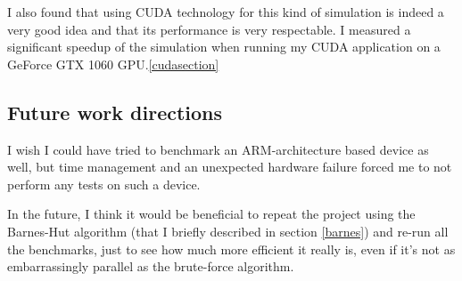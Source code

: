 \documentclass[journal]{IEEEtran}
\begin{document}
		I also found that using CUDA technology for this kind of simulation is indeed a very good idea and that its performance is very respectable. I measured a significant speedup of the simulation when running my CUDA application on a GeForce GTX 1060 GPU.\ref{cudasection}

		\subsection*{Future work directions}	
			
			I wish I could have tried to benchmark an ARM-architecture based device as well, but time management and an unexpected hardware failure forced me to not perform any tests on such a device.
			
			In the future, I think it would be beneficial to repeat the project using the Barnes-Hut algorithm (that I briefly described in section \ref{barnes}) and re-run all the benchmarks, just to see how much more efficient it really is, even if it's not as embarrassingly parallel as the brute-force algorithm.
			
	
	
	
	
\end{document}
